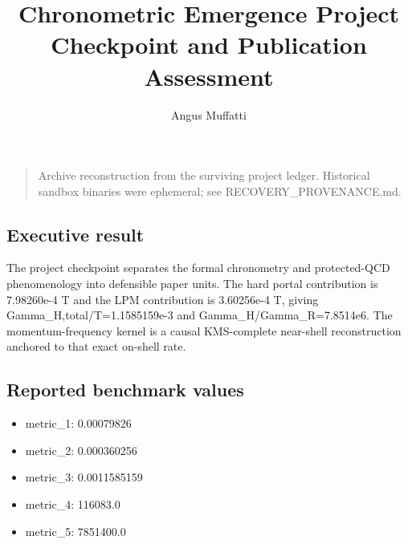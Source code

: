\documentclass[
]{article}
\title{Chronometric Emergence Project Checkpoint and Publication
Assessment}
\author{Angus Muffatti}
\date{}
\providecommand{\tightlist}{%
  \setlength{\itemsep}{0pt}\setlength{\parskip}{0pt}}
\begin{document}
\maketitle

\begin{quote}
Archive reconstruction from the surviving project ledger. Historical
sandbox binaries were ephemeral; see RECOVERY\_PROVENANCE.md.
\end{quote}

\hypertarget{executive-result}{%
\subsection{Executive result}\label{executive-result}}

The project checkpoint separates the formal chronometry and
protected-QCD phenomenology into defensible paper units. The hard portal
contribution is 7.98260e-4 T and the LPM contribution is 3.60256e-4 T,
giving Gamma\_H,total/T=1.1585159e-3 and Gamma\_H/Gamma\_R=7.8514e6. The
momentum-frequency kernel is a causal KMS-complete near-shell
reconstruction anchored to that exact on-shell rate.

\hypertarget{reported-benchmark-values}{%
\subsection{Reported benchmark values}\label{reported-benchmark-values}}

\begin{itemize}
\tightlist
\item
  metric\_1: 0.00079826
\item
  metric\_2: 0.000360256
\item
  metric\_3: 0.0011585159
\item
  metric\_4: 116083.0
\item
  metric\_5: 7851400.0
\end{itemize}
\end{document}
